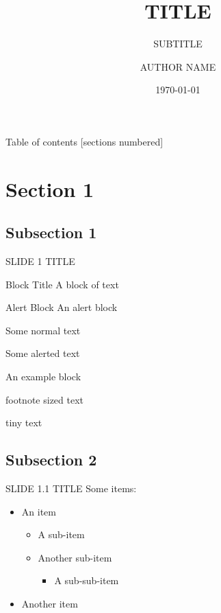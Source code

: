 \documentclass[10pt,xcolor={dvipsnames},aspectratio=169]{beamer}
\title{TITLE}
\subtitle{SUBTITLE}
\date{\today}
\author{AUTHOR NAME}
\institute{INSTITUTE}
\begin{document}
{
  \titletemplate
  \maketitle
}

\begin{frame}{Table of contents}
  [sections numbered]
  \tableofcontents%
\end{frame}

\section{Section 1}

\subsection{Subsection 1}

\begin{frame}{SLIDE 1 TITLE}
  \begin{block}{Block Title}
    A block of text
  \end{block}
  \begin{alertblock}{Alert Block}
    An alert block
  \end{alertblock}
  Some normal text

  Some \alert{alerted} text

  \begin{example}
    An example block
  \end{example}

  \footnotesize{footnote sized text}

  \tiny{tiny text}
\end{frame}

\subsection{Subsection 2}

\begin{frame}{SLIDE 1.1 TITLE}
  Some items:
  \begin{itemize}
    \item An item
      \begin{itemize}
        \item A sub-item
        \item Another sub-item
          \begin{itemize}
            \item A sub-sub-item
          \end{itemize}
      \end{itemize}
    \item Another item
  \end{itemize}
\end{frame}
\end{document}
